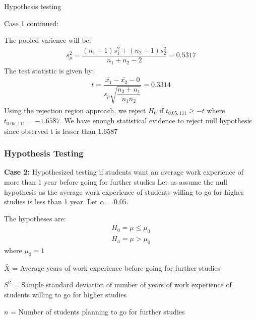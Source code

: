 \documentclass{beamer}
\begin{document}
\begin{frame}{Hypothesis testing}

    \begin{block}{Case 1 continued:}

        The pooled varience will be:
        \begin{align}
            s^2_p=\dfrac{(n_1-1)s^2_1+(n_2-1)s^2_2}{n_1+n_2-2}=0.5317
        \end{align}
        The test statistic is given by:
        \begin{align}
            t=\dfrac{\bar{x_1}-\bar{x_2}-0}{s_p\sqrt{\dfrac{n_2+n_1}{n_1n_2}}}=0.3314
        \end{align}
        Using the rejection region approach, we reject $H_0$ if
        $t_{0.05,111}\geq -t$ where $t_{0.05,111}=-1.6587$. We have enough
        statistical
        evidence to reject null hypothesis since observed t is lesser than
        1.6587

    \end{block}
\end{frame}

\begin{frame}
  \frametitle{Hypothesis Testing}
  \begin{block}{\textbf{Case 2:}{ Hypothesized testing if students want an average work experience of more than 1 year before going for further studies }}
     Let us assume the null hypothesis as the average work experience of students willing to go for higher studies is  less than 1 year. Let $\alpha = 0.05$.

     The hypotheses are:
      \begin{align*}
          H_0=\mu\leq \mu_0\\
          H_a=\mu > \mu_0
      \end{align*}
      where $\mu_0 = 1$

     \begin{enumerate*}
         \item  $\bar{X}$ = Average years of work experience before going for further studies\\
         \item  $S^2$ = Sample standard deviation of number of years of work experience of students willing to go for higher studies\\
         \item $n$ = Number of students planning to go for further studies\\
     \end{enumerate*}
        \end{block}
    \end{frame}
\end{document}
